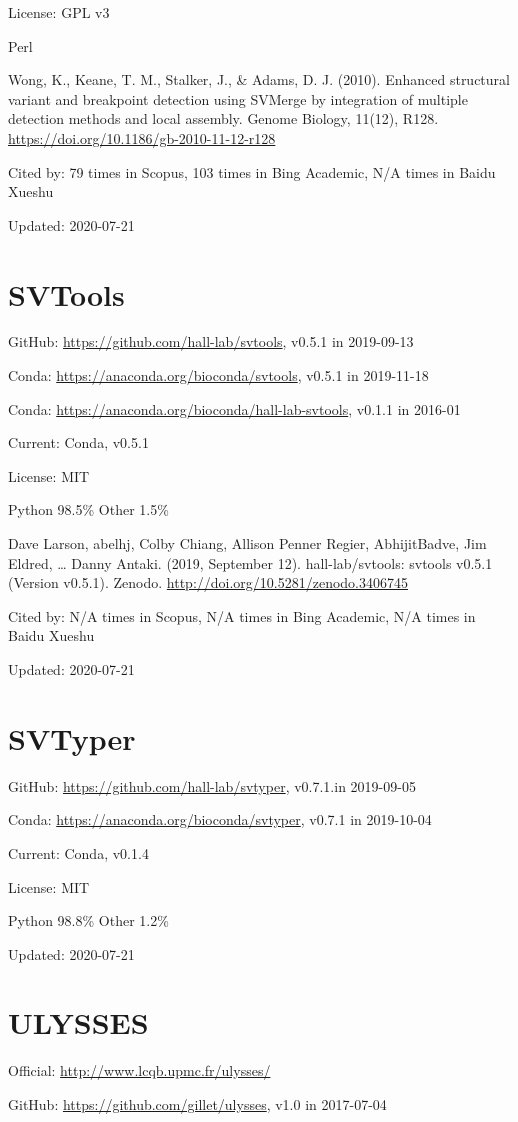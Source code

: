 \documentclass[]{article}
\newcommand{\cb}[3]{\par Cited by: {\color{blue}\Huge #1} times in Scopus, {\color{blue}\Huge #2} times in Bing Academic, {\color{blue}\Huge #3} times in Baidu Xueshu}
\begin{document}
License: GPL v3

Perl

Wong, K., Keane, T. M., Stalker, J., \& Adams, D. J. (2010). Enhanced structural variant and breakpoint detection using SVMerge by integration of multiple detection methods and local assembly. Genome Biology, 11(12), R128. \url{https://doi.org/10.1186/gb-2010-11-12-r128}\cb{79}{103}{N/A}

Updated: 2020-07-21

\section{SVTools}

GitHub: \url{https://github.com/hall-lab/svtools}, v0.5.1 in 2019-09-13

Conda: \url{https://anaconda.org/bioconda/svtools}, v0.5.1 in 2019-11-18

Conda: \url{https://anaconda.org/bioconda/hall-lab-svtools}, v0.1.1 in 2016-01

Current: Conda, v0.5.1

License: MIT

Python 98.5\% Other 1.5\%

Dave Larson, abelhj, Colby Chiang, Allison Penner Regier, AbhijitBadve, Jim Eldred, … Danny Antaki. (2019, September 12). hall-lab/svtools: svtools v0.5.1 (Version v0.5.1). Zenodo. \url{http://doi.org/10.5281/zenodo.3406745}\cb{N/A}{N/A}{N/A}

Updated: 2020-07-21

\section{SVTyper}

GitHub: \url{https://github.com/hall-lab/svtyper}, v0.7.1.in 2019-09-05

Conda: \url{https://anaconda.org/bioconda/svtyper}, v0.7.1 in 2019-10-04

Current: Conda, v0.1.4

License: MIT

Python 98.8\% Other 1.2\%

Updated: 2020-07-21

\section{ULYSSES}

Official: \url{http://www.lcqb.upmc.fr/ulysses/}

GitHub: \url{https://github.com/gillet/ulysses}, v1.0 in 2017-07-04
\end{document}
